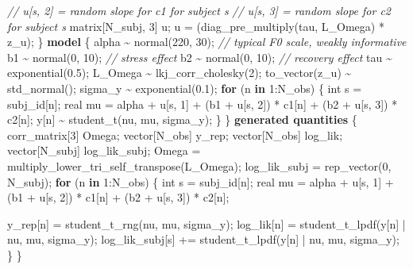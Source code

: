 \documentclass[
  english,
  man,floatsintext]{apa6}
\newenvironment{Shaded}{\begin{snugshade}}{\end{snugshade}}
\newcommand{\CommentTok}[1]{\textcolor[rgb]{0.56,0.35,0.01}{\textit{#1}}}
\newcommand{\ControlFlowTok}[1]{\textcolor[rgb]{0.13,0.29,0.53}{\textbf{#1}}}
\newcommand{\DataTypeTok}[1]{\textcolor[rgb]{0.13,0.29,0.53}{#1}}
\newcommand{\DecValTok}[1]{\textcolor[rgb]{0.00,0.00,0.81}{#1}}
\newcommand{\FloatTok}[1]{\textcolor[rgb]{0.00,0.00,0.81}{#1}}
\newcommand{\KeywordTok}[1]{\textcolor[rgb]{0.13,0.29,0.53}{\textbf{#1}}}
\newcommand{\NormalTok}[1]{#1}
\begin{document}
\begin{Shaded}
\begin{Highlighting}[]
  \CommentTok{// u[s, 2] = random slope for c1 for subject s}
  \CommentTok{// u[s, 3] = random slope for c2 for subject s}
  \DataTypeTok{matrix}\NormalTok{[N\_subj, }\DecValTok{3}\NormalTok{] u;}
\NormalTok{  u = (diag\_pre\_multiply(tau, L\_Omega) * z\_u)\textquotesingle{};}
\NormalTok{\}}
\KeywordTok{model}\NormalTok{ \{}
\NormalTok{  alpha \textasciitilde{} normal(}\DecValTok{220}\NormalTok{, }\DecValTok{30}\NormalTok{);  }\CommentTok{// typical F0 scale, weakly informative}
\NormalTok{  b1 \textasciitilde{} normal(}\DecValTok{0}\NormalTok{, }\DecValTok{10}\NormalTok{);       }\CommentTok{// stress effect}
\NormalTok{  b2 \textasciitilde{} normal(}\DecValTok{0}\NormalTok{, }\DecValTok{10}\NormalTok{);       }\CommentTok{// recovery effect}
\NormalTok{  tau \textasciitilde{} exponential(}\FloatTok{0.5}\NormalTok{);}
\NormalTok{  L\_Omega \textasciitilde{} lkj\_corr\_cholesky(}\DecValTok{2}\NormalTok{);}
\NormalTok{  to\_vector(z\_u) \textasciitilde{} std\_normal();}
\NormalTok{  sigma\_y \textasciitilde{} exponential(}\FloatTok{0.1}\NormalTok{);}
  \ControlFlowTok{for}\NormalTok{ (n }\ControlFlowTok{in} \DecValTok{1}\NormalTok{:N\_obs) \{}
    \DataTypeTok{int}\NormalTok{ s = subj\_id[n];}
    \DataTypeTok{real}\NormalTok{ mu = alpha + u[s, }\DecValTok{1}\NormalTok{]}
\NormalTok{            + (b1 + u[s, }\DecValTok{2}\NormalTok{]) * c1[n]}
\NormalTok{            + (b2 + u[s, }\DecValTok{3}\NormalTok{]) * c2[n];}
\NormalTok{    y[n] \textasciitilde{} student\_t(nu, mu, sigma\_y);}
\NormalTok{  \}}
\NormalTok{\}}
\KeywordTok{generated quantities}\NormalTok{ \{}
  \DataTypeTok{corr\_matrix}\NormalTok{[}\DecValTok{3}\NormalTok{] Omega;}
  \DataTypeTok{vector}\NormalTok{[N\_obs] y\_rep;}
  \DataTypeTok{vector}\NormalTok{[N\_obs] log\_lik;}
  \DataTypeTok{vector}\NormalTok{[N\_subj] log\_lik\_subj;}
\NormalTok{  Omega = multiply\_lower\_tri\_self\_transpose(L\_Omega);}
\NormalTok{  log\_lik\_subj = rep\_vector(}\DecValTok{0}\NormalTok{, N\_subj);}
  \ControlFlowTok{for}\NormalTok{ (n }\ControlFlowTok{in} \DecValTok{1}\NormalTok{:N\_obs) \{}
    \DataTypeTok{int}\NormalTok{ s = subj\_id[n];}
    \DataTypeTok{real}\NormalTok{ mu = alpha + u[s, }\DecValTok{1}\NormalTok{]}
\NormalTok{            + (b1 + u[s, }\DecValTok{2}\NormalTok{]) * c1[n]}
\NormalTok{            + (b2 + u[s, }\DecValTok{3}\NormalTok{]) * c2[n];}

\NormalTok{    y\_rep[n] = student\_t\_rng(nu, mu, sigma\_y);}
\NormalTok{    log\_lik[n] = student\_t\_lpdf(y[n] | nu, mu, sigma\_y);}
\NormalTok{    log\_lik\_subj[s] += student\_t\_lpdf(y[n] | nu, mu, sigma\_y);}
\NormalTok{  \}}
\NormalTok{\}}
\end{Highlighting}
\end{Shaded}
\end{document}
